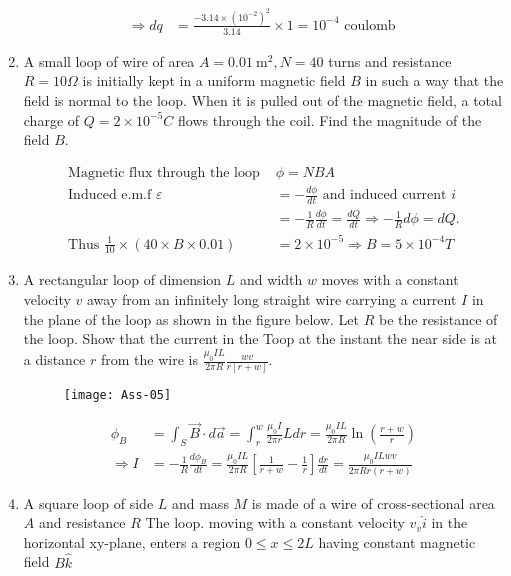 \begin{enumerate}
\begin{answer}
\begin{align*}
		\Rightarrow d q&=\frac{-3.14 \times\left(10^{-2}\right)^{2}}{3.14} \times 1=10^{-4} \text { coulomb }
		\end{align*}
	\end{answer}
	\item A small loop of wire of area $A=0.01 \mathrm{~m}^{2}, N=40$ turns and resistance $R=10 \Omega$ is initially kept in a uniform magnetic field $B$ in such a way that the field is normal to the loop. When it is pulled out of the magnetic field, a total charge of $Q=2 \times 10^{-5} C$ flows through the coil. Find the magnitude of the field $B$.
	\begin{answer}
		\begin{align*}
		\text { Magnetic flux through the loop }& \phi=N B A\\
		\text { Induced e.m.f } \varepsilon&=-\frac{d \phi}{d t} \text { and induced current } i\\&=-\frac{1}{R} \frac{d \phi}{d t}=\frac{d Q}{d t} \Rightarrow-\frac{1}{R} d \phi=d Q \text {. }\\
		\text { Thus } \frac{1}{10} \times(40 \times B \times 0.01)&=2 \times 10^{-5} \Rightarrow B=5 \times 10^{-4} T
		\end{align*}
	\end{answer}
	\item A rectangular loop of dimension $L$ and width $w$ moves with a constant velocity $v$ away from an infinitely long straight wire carrying a current $I$ in the plane of the loop as shown in the figure below. Let $R$ be the resistance of the loop. Show that the current in the Toop at the instant the near side is at a distance $r$ from the wire is $\frac{\mu_{0} I L}{2 \pi R} \frac{w v}{r[r+w]}$.
	\begin{figure}[H]
		\centering
		\texttt{[image: Ass-05]}
	\end{figure}
\begin{answer}
	\begin{align*}
	\phi_{B}&=\int_{S} \vec{B} \cdot d \vec{a}=\int_{r}^{w} \frac{\mu_{0} I}{2 \pi r} L d r=\frac{\mu_{0} I L}{2 \pi R} \ln \left(\frac{r+w}{r}\right)\\
	\Rightarrow I&=-\frac{1}{R} \frac{d \phi_{B}}{d t}=\frac{\mu_{0} I L}{2 \pi R}\left[\frac{1}{r+w}-\frac{1}{r}\right] \frac{d r}{d t}=\frac{\mu_{0} I L w v}{2 \pi R r(r+w)}
	\end{align*}
\end{answer}
	\item A square loop of side $L$ and mass $M$ is made of a wire of cross-sectional area $A$ and resistance $R$ The loop. moving with a constant velocity $v_{v} \hat{i}$ in the horizontal xy-plane, enters a region $0 \leq x \leq 2 L$ having constant magnetic field $B \hat{k}$

\end{enumerate}
